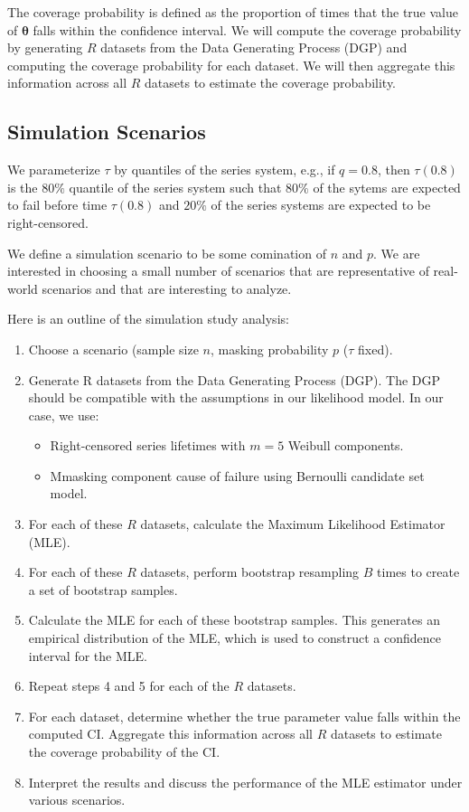 \documentclass[
]{article}
\begin{document}
The coverage probability is defined as the proportion of times that the
true value of \(\boldsymbol{\theta}\) falls within the confidence
interval. We will compute the coverage probability by generating \(R\)
datasets from the Data Generating Process (DGP) and computing the
coverage probability for each dataset. We will then aggregate this
information across all \(R\) datasets to estimate the coverage
probability.

\hypertarget{simulation-scenarios}{%
\subsection{Simulation Scenarios}\label{simulation-scenarios}}

We parameterize \(\tau\) by quantiles of the series system, e.g., if
\(q = 0.8\), then \(\tau(0.8)\) is the \(80\%\) quantile of the series
system such that \(80\%\) of the sytems are expected to fail before time
\(\tau(0.8)\) and \(20\%\) of the series systems are expected to be
right-censored.

We define a simulation scenario to be some comination of \(n\) and
\(p\). We are interested in choosing a small number of scenarios that
are representative of real-world scenarios and that are interesting to
analyze.

Here is an outline of the simulation study analysis:

\begin{enumerate}
\def\labelenumi{\arabic{enumi}.}
\item
  Choose a scenario (sample size \(n\), masking probability \(p\)
  (\(\tau\) fixed).
\item
  Generate R datasets from the Data Generating Process (DGP). The DGP
  should be compatible with the assumptions in our likelihood model. In
  our case, we use:

  \begin{itemize}
  \item
    Right-censored series lifetimes with \(m = 5\) Weibull components.
  \item
    Mmasking component cause of failure using Bernoulli candidate set
    model.
  \end{itemize}
\item
  For each of these \(R\) datasets, calculate the Maximum Likelihood
  Estimator (MLE).
\item
  For each of these \(R\) datasets, perform bootstrap resampling \(B\)
  times to create a set of bootstrap samples.
\item
  Calculate the MLE for each of these bootstrap samples. This generates
  an empirical distribution of the MLE, which is used to construct a
  confidence interval for the MLE.
\item
  Repeat steps 4 and 5 for each of the \(R\) datasets.
\item
  For each dataset, determine whether the true parameter value falls
  within the computed CI. Aggregate this information across all \(R\)
  datasets to estimate the coverage probability of the CI.
\item
  Interpret the results and discuss the performance of the MLE estimator
  under various scenarios.
\end{enumerate}
\end{document}
